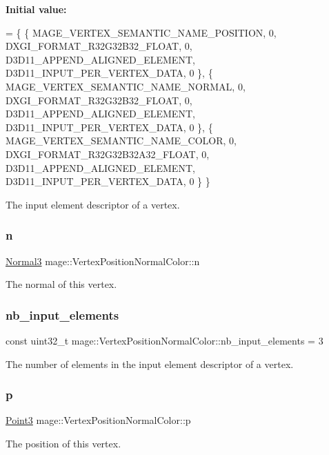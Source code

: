 {\bfseries Initial value\+:}
\begin{DoxyCode}
= \{
        \{ MAGE\_VERTEX\_SEMANTIC\_NAME\_POSITION, 0, DXGI\_FORMAT\_R32G32B32\_FLOAT,    0, 
      D3D11\_APPEND\_ALIGNED\_ELEMENT, D3D11\_INPUT\_PER\_VERTEX\_DATA, 0 \},
        \{ MAGE\_VERTEX\_SEMANTIC\_NAME\_NORMAL,   0, DXGI\_FORMAT\_R32G32B32\_FLOAT,    0, 
      D3D11\_APPEND\_ALIGNED\_ELEMENT, D3D11\_INPUT\_PER\_VERTEX\_DATA, 0 \},
        \{ MAGE\_VERTEX\_SEMANTIC\_NAME\_COLOR,    0, DXGI\_FORMAT\_R32G32B32A32\_FLOAT, 0, 
      D3D11\_APPEND\_ALIGNED\_ELEMENT, D3D11\_INPUT\_PER\_VERTEX\_DATA, 0 \}
    \}
\end{DoxyCode}
The input element descriptor of a vertex. \hypertarget{structmage_1_1_vertex_position_normal_color_a771c7e71e8b6441b73f513f511507650}{}\label{structmage_1_1_vertex_position_normal_color_a771c7e71e8b6441b73f513f511507650} 
\subsubsection{\texorpdfstring{n}{n}}
{\footnotesize\ttfamily \hyperlink{structmage_1_1_normal3}{Normal3} mage\+::\+Vertex\+Position\+Normal\+Color\+::n}

The normal of this vertex. \hypertarget{structmage_1_1_vertex_position_normal_color_aa879572455aa5921256ddd734b8600fc}{}\label{structmage_1_1_vertex_position_normal_color_aa879572455aa5921256ddd734b8600fc} 
\subsubsection{\texorpdfstring{nb\+\_\+input\+\_\+elements}{nb\_input\_elements}}
{\footnotesize\ttfamily const uint32\+\_\+t mage\+::\+Vertex\+Position\+Normal\+Color\+::nb\+\_\+input\+\_\+elements = 3\hspace{0.3cm}{\ttfamily [static]}}

The number of elements in the input element descriptor of a vertex. \hypertarget{structmage_1_1_vertex_position_normal_color_a6847c367ca68fb8d8e349c8441ae63dd}{}\label{structmage_1_1_vertex_position_normal_color_a6847c367ca68fb8d8e349c8441ae63dd} 
\subsubsection{\texorpdfstring{p}{p}}
{\footnotesize\ttfamily \hyperlink{structmage_1_1_point3}{Point3} mage\+::\+Vertex\+Position\+Normal\+Color\+::p}

The position of this vertex. 